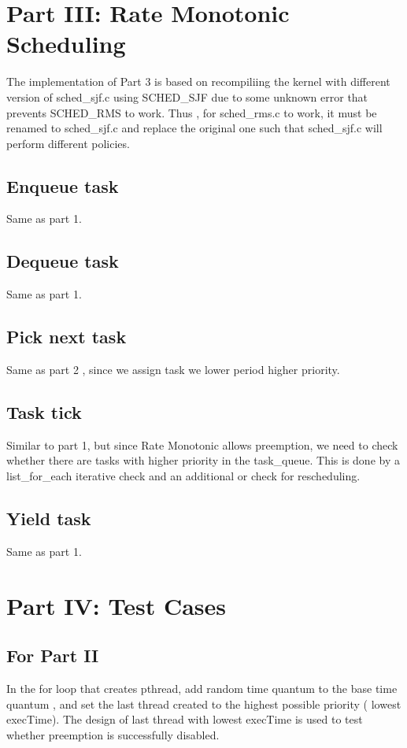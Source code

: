 \documentclass[12pt]{article}
\begin{document}
  \section*{Part III: Rate Monotonic Scheduling}
  The implementation of Part 3 is based on recompiliing the kernel with different version of sched\_sjf.c using SCHED\_SJF due to some unknown error that prevents SCHED\_RMS to work. Thus , for sched\_rms.c to work, it must be renamed to sched\_sjf.c and replace the original one such that sched\_sjf.c will perform different policies.

  \subsection*{Enqueue task}
  	Same as part 1.
  \subsection*{Dequeue task}
  	Same as part 1.
  \subsection*{Pick next task}
  	Same as part 2 , since we assign task we lower period higher priority.

  \subsection*{Task tick}
  	Similar to part 1, but since Rate Monotonic allows preemption, we need to check whether there are tasks with higher priority in the task\_queue. This is done by a list\_for\_each iterative check and an additional or check for rescheduling.

  \subsection*{Yield task}
  	Same as part 1.

\section*{Part IV: Test Cases}
  \subsection*{For Part II}
    In the for loop that creates pthread, add random time quantum to the base time quantum , and set the last thread created to the highest possible priority ( lowest execTime). The design of last thread with lowest execTime is used to test whether preemption is successfully disabled.
\end{document}
